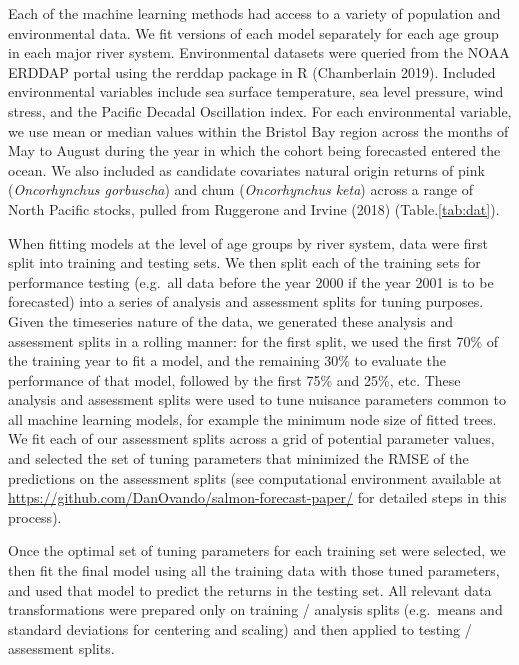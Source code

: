 \documentclass[
]{article}
\begin{document}
Each of the machine learning methods had access to a variety of population and environmental data. We fit versions of each model separately for each age group in each major river system. Environmental datasets were queried from the NOAA ERDDAP portal using the rerddap package in R (Chamberlain 2019). Included environmental variables include sea surface temperature, sea level pressure, wind stress, and the Pacific Decadal Oscillation index. For each environmental variable, we use mean or median values within the Bristol Bay region across the months of May to August during the year in which the cohort being forecasted entered the ocean. We also included as candidate covariates natural origin returns of pink (\emph{Oncorhynchus gorbuscha}) and chum (\emph{Oncorhynchus keta}) across a range of North Pacific stocks, pulled from Ruggerone and Irvine (2018) (Table.\ref{tab:dat}).

When fitting models at the level of age groups by river system, data were first split into training and testing sets. We then split each of the training sets for performance testing (e.g.~all data before the year 2000 if the year 2001 is to be forecasted) into a series of analysis and assessment splits for tuning purposes. Given the timeseries nature of the data, we generated these analysis and assessment splits in a rolling manner: for the first split, we used the first 70\% of the training year to fit a model, and the remaining 30\% to evaluate the performance of that model, followed by the first 75\% and 25\%, etc. These analysis and assessment splits were used to tune nuisance parameters common to all machine learning models, for example the minimum node size of fitted trees. We fit each of our assessment splits across a grid of potential parameter values, and selected the set of tuning parameters that minimized the RMSE of the predictions on the assessment splits (see computational environment available at \url{https://github.com/DanOvando/salmon-forecast-paper/} for detailed steps in this process).

Once the optimal set of tuning parameters for each training set were selected, we then fit the final model using all the training data with those tuned parameters, and used that model to predict the returns in the testing set. All relevant data transformations were prepared only on training / analysis splits (e.g.~means and standard deviations for centering and scaling) and then applied to testing / assessment splits.
\end{document}

